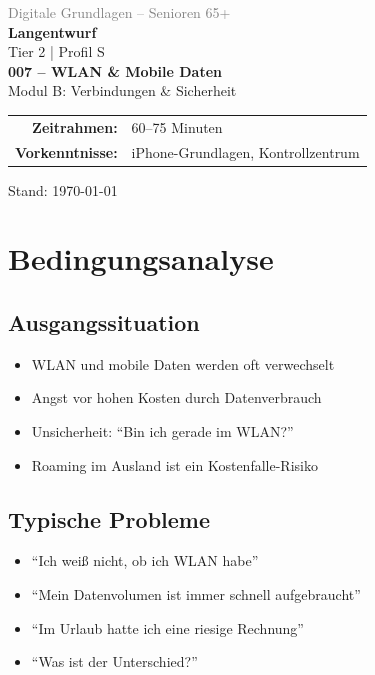 \documentclass[11pt,a4paper]{article}
\begin{document}
\begin{titlepage}
    \centering
    \vspace*{2cm}
    {\Large\textcolor{gray}{Digitale Grundlagen -- Senioren 65+}}\\[2cm]
    {\Huge\textcolor{fach}{\textbf{Langentwurf}}}\\[0.5cm]
    {\large Tier 2 | Profil S}\\[2cm]
    {\LARGE\textbf{007 -- WLAN \& Mobile Daten}}\\[0.5cm]
    {\large Modul B: Verbindungen \& Sicherheit}\\[2cm]
    \begin{tabular}{rl}
        \textbf{Zeitrahmen:} & 60--75 Minuten \\
        \textbf{Vorkenntnisse:} & iPhone-Grundlagen, Kontrollzentrum \\
    \end{tabular}
    \vfill
    {\normalsize Stand: \today}
\end{titlepage}

\tableofcontents
\newpage

\section{Bedingungsanalyse}

\subsection{Ausgangssituation}
\begin{itemize}
    \item WLAN und mobile Daten werden oft verwechselt
    \item Angst vor hohen Kosten durch Datenverbrauch
    \item Unsicherheit: ``Bin ich gerade im WLAN?''
    \item Roaming im Ausland ist ein Kostenfalle-Risiko
\end{itemize}

\subsection{Typische Probleme}
\begin{itemize}
    \item ``Ich weiß nicht, ob ich WLAN habe''
    \item ``Mein Datenvolumen ist immer schnell aufgebraucht''
    \item ``Im Urlaub hatte ich eine riesige Rechnung''
    \item ``Was ist der Unterschied?''
\end{itemize}
\end{document}
